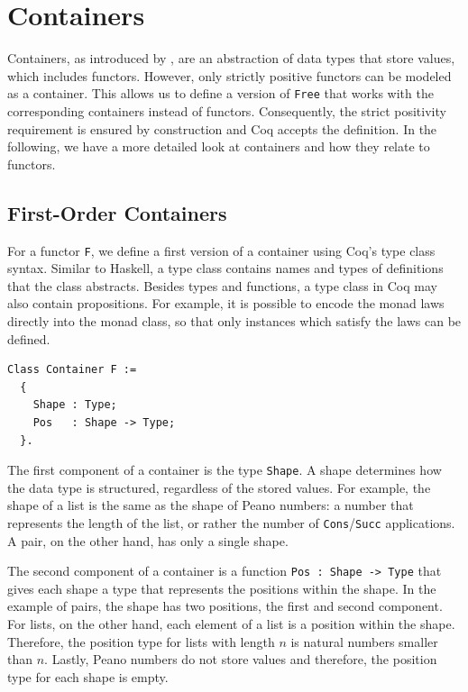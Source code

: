 \documentclass[a4paper, 11pt, fleqn, twoside]{scrreprt}
\newcommand{\cinl}[1]{\texttt{#1}}
\begin{document}
\section{Containers}

Containers, as introduced by \citet{Abbott2005containers}, are an abstraction of data types that store values, which includes functors.
However, only strictly positive functors can be modeled as a container.
This allows us to define a version of \cinl{Free} that works with the corresponding containers instead of functors.
Consequently, the strict positivity requirement is ensured by construction and Coq accepts the definition.
In the following, we have a more detailed look at containers and how they relate to functors.

\subsection{First-Order Containers}
For a functor \cinl{F}, we define a first version of a container using Coq's type class syntax.
Similar to Haskell, a type class contains names and types of definitions that the class abstracts.
Besides types and functions, a type class in Coq may also contain propositions.
For example, it is possible to encode the monad laws directly into the monad class, so that only instances which satisfy the laws can be defined.

\begin{verbatim}
Class Container F :=
  {
    Shape : Type;
    Pos   : Shape -> Type;
  }.
\end{verbatim}

The first component of a container is the type \texttt{Shape}.
A shape determines how the data type is structured, regardless of the stored values.
For example, the  shape of a list is the same as the shape of Peano numbers: a number that  represents the length of the list, or rather the number of \cinl{Cons}/\cinl{Succ} applications.
A pair, on the other hand, has only a single shape.

The second component of a container is a function \cinl{Pos : Shape -> Type} that gives each shape a type that represents the positions within the shape.
In the example of pairs, the shape has two positions, the first and second component.
For lists, on the other hand, each element of a list is a position within the shape.
Therefore, the position type for lists with length $n$ is natural numbers smaller than $n$.
Lastly, Peano numbers do not store values and therefore, the position type for each shape is empty.
\end{document}
